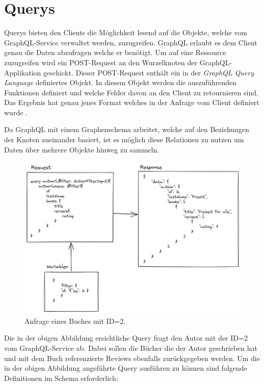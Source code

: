 
\section{Querys}

Querys bieten den Clients die Möglichkeit lesend auf die Objekte, welche vom GraphQL-Service verwaltet werden, zuzugreifen.
GraphQL erlaubt es dem Client genau die Daten abzufragen welche er benötigt.
Um auf eine Ressource zuzugreifen wird ein POST-Request an den Wurzelknoten der GraphQL-Applikation geschickt.
Dieser POST-Request enthält ein in der \textit{GraphQL Query Language} definiertes Objekt.
In diesem Objekt werden die auszuführenden Funktionen definiert und welche Felder davon an den Client zu retournieren sind.
Das Ergebnis hat genau jenes Format welches in der Anfrage vom Client definiert wurde \cite[S.40-41]{kress2020graphql}.
\newline

Da GraphQL mit einem Graphenschema arbeitet, welche auf den Beziehungen der Knoten zueinander basiert, ist es möglich diese Relationen zu nutzen um Daten über mehrere Objekte hinweg zu sammeln.
\newline

\begin{figure}[H]
    \includegraphics[width=\textwidth]{pics/query_book_with_result.png}
    \caption{Anfrage eines Buches mit ID=2.}
\end{figure}

Die in der obigen Abbildung ersichtliche Query fragt den Autor mit der ID=2 vom GraphQL-Service ab.
Dabei sollen die Bücher die der Autor geschrieben hat und mit dem Buch referenzierte Reviews ebenfalls zurückgegeben werden.
Um die in der obigen Abbildung angeführte Query ausführen zu können sind folgende Definitionen im Schema erforderlich:

